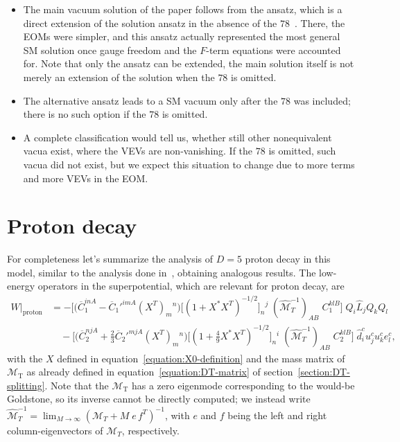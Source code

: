 \documentclass[a4paper,12pt]{article}
\begin{document}
\begin{itemize}
\item The main vacuum solution of the paper follows from the ansatz, which is a direct extension of the solution ansatz in the absence of the $78$~\cite{Bajc:2013qra}. There, the EOMs were simpler, and this ansatz actually represented the most general SM solution once gauge freedom and the $F$-term equations were accounted for. Note that only the ansatz can be extended, the main solution itself is not merely an extension of the solution when the $78$ is omitted.
\item The alternative ansatz leads to a SM vacuum only after the $78$ was included; there is no such option if the $78$ is omitted.
\item A complete classification would tell us, whether still other nonequivalent vacua exist, where the VEVs are non-vanishing. If the $78$ is omitted, such vacua did not exist, but we expect this situation to change due to more terms and more VEVs in the EOM.
\end{itemize}



\section{Proton decay \label{Proton-decay}}
For completeness let's summarize the analysis of $D=5$ proton decay in this model, similar to the analysis done in~\cite{Bajc:2013qra}, obtaining analogous results. The low-energy operators in the superpotential, which are relevant for proton decay, are
\begin{align}
W\big|_{\textrm{proton}}&=-\Big[\big(\overline{C}_1^{inA}-\overline{C}_1'^{imA}(X^T)_{m}{}^{n}\big)\big[(1+X^\ast X^T)^{-1/2}\big]_{n}{}^{j}\;(\hat{\mathcal{M}}_T^{-1})_{AB}\; C_1^{klB}\Big]\;Q_i \hat{L}_j Q_k Q_l\nonumber\\
&\quad -\Big[\big(\overline{C}_2^{njA}+\tfrac{2}{3}\overline{C}_2'^{mjA}(X^T)_{m}{}^{n}\big)\big[(1+\tfrac{4}{9}X^\ast X^T)^{-1/2}\big]_{n}{}^{i}\;(\hat{\mathcal{M}}_T^{-1})_{AB}\; C_2^{klB}\Big]\;\hat{d}^c_i u^c_j u^c_k e^c_l,
\end{align}
\noindent
with the $X$ defined in equation~\eqref{equation:X0-definition} and the mass matrix of $\mathcal{M}_{\textrm{T}}$ as already defined in equation~\eqref{equation:DT-matrix} of section~\ref{section:DT-splitting}. Note that the $\mathcal{M}_{\textrm{T}}$ has a zero eigenmode corresponding to the would-be Goldstone, so its inverse cannot be directly computed; we instead write $\hat{\mathcal{M}}_{T}^{-1}=\lim_{M\to\infty}(\mathcal{M}_T+M\;e\,f^T)^{-1}$, with $e$ and $f$ being the left and right column-eigenvectors of $\mathcal{M}_T$, respectively.
\end{document}
